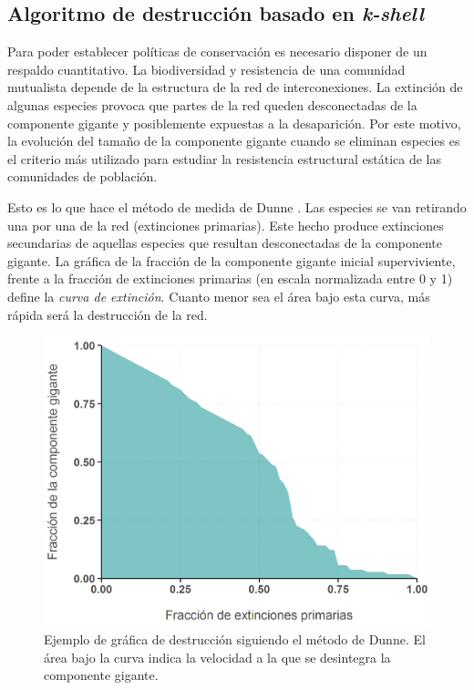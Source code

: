 \subsection{Algoritmo de destrucción basado en \textit{k-shell}}

Para poder establecer políticas de conservación es necesario disponer de un respaldo cuantitativo. La biodiversidad y resistencia de una comunidad mutualista depende de la estructura de la red de interconexiones. La extinción de algunas especies provoca que partes de la red queden desconectadas de la componente gigante y posiblemente expuestas a la desaparición. Por este motivo, la evolución del tamaño de la componente gigante cuando se eliminan especies es el criterio más utilizado para estudiar la resistencia estructural estática de las comunidades de población.

Esto es lo que hace el método de medida de Dunne \cite{dunne2002biodiversity}. Las especies se van retirando una por una de la red (extinciones primarias). Este hecho produce extinciones secundarias de aquellas especies que resultan desconectadas de la componente gigante. La gráfica de la fracción de la componente gigante inicial superviviente, frente a la fracción de extinciones primarias (en escala normalizada entre 0 y 1) define la \textit{curva de extinción}. Cuanto menor sea el área bajo esta curva, más rápida será la destrucción de la red.

\begin{figure}[h!]
\centering
\includegraphics[scale=0.55]{Figures/ESTATICA_destruction_example.png}
\caption[PolarExample]{Ejemplo de gráfica de destrucción siguiendo el método de Dunne. El área bajo la curva indica la velocidad a la que se desintegra la componente gigante.}
\label{fig:ESTATICA_destruction_example}
\end{figure}

